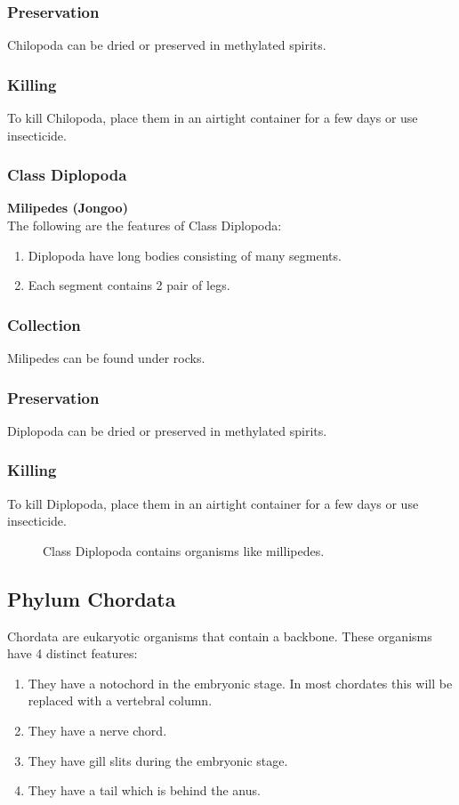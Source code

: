 \subsubsection{Preservation} 
Chilopoda can be dried or preserved in methylated spirits.

\subsubsection{Killing}
To kill Chilopoda, place them in an airtight container for a few days or use insecticide.

\subsubsection{Class Diplopoda}
\textbf{Milipedes (Jongoo)}\\
The following are the features of Class Diplopoda:
\begin{enumerate}
\item{Diplopoda have long bodies consisting of many segments.}
\item{Each segment contains 2 pair of legs.}
\end{enumerate}

\subsubsection{Collection}
Milipedes can be found under rocks.

\subsubsection{Preservation} 
Diplopoda can be dried or preserved in methylated spirits.

\subsubsection{Killing}
To kill Diplopoda, place them in an airtight container for a few days or use insecticide.
		
\begin{figure}[h]
\begin{center}
\def\svgwidth{6cm}

\caption{Class Diplopoda contains organisms like millipedes.}
\label{fig:Diplopoda}
\end{center}
\end{figure}


\subsection{Phylum Chordata}
Chordata are eukaryotic organisms that contain a backbone. These organisms have 4 distinct features:
\begin{enumerate}
\item{They have a notochord in the embryonic stage. In most chordates this will be replaced with a vertebral column.}
\item{They have a nerve chord.}
\item{They have gill slits during the embryonic stage.}
\item{They have a tail which is behind the anus.}
\end{enumerate}


